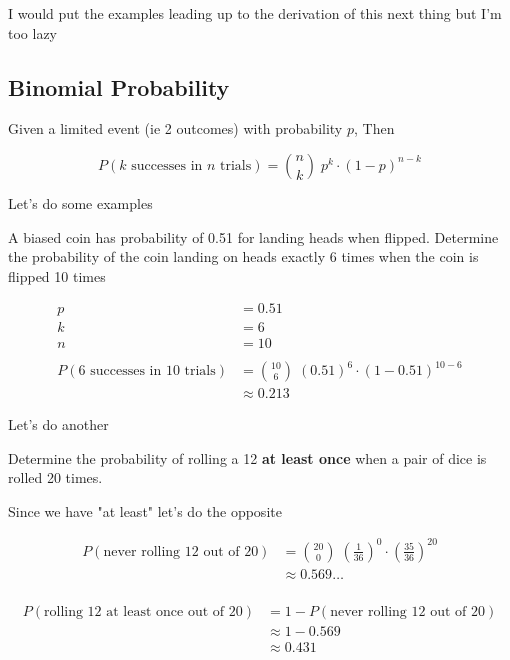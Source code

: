 \documentclass[../../Main.tex]{subfiles}
\begin{document}
I would put the examples leading up to the derivation of this next thing but I'm too lazy

\subsection{Binomial Probability}

\begin{definition}
    Given a limited event (ie 2 outcomes) with probability $p$, Then 

    $$P(k \text{ successes in } n \text{ trials}) = {n \choose k} \; p^k \cdot (1 - p)^{n - k}$$
\end{definition}

\begin{example}
    Let's do some examples

    A biased coin has probability of 0.51 for landing heads when flipped. Determine the probability of the coin landing on heads exactly 6 times when the coin is flipped 10 times

    \begin{align*}
        p &= 0.51 \\
        k &= 6 \tag{successes} \\
        n &= 10 \\
        \\
        P(6 \text{ successes in } 10 \text{ trials}) &= {10 \choose 6} \; (0.51)^6 \cdot (1 - 0.51)^{10 - 6} \\
        &\approx \boxed{0.213}
    \end{align*}
\end{example}

\begin{example}
    Let's do another

    Determine the probability of rolling a 12 \textbf{at least once} when a pair of dice is rolled 20 times.

    Since we have "at least" let's do the opposite

    \begin{align*}
        P(\text{never rolling 12 out of 20}) &= {20 \choose 0} \; \left(\frac{1}{36}\right)^0 \cdot \left(\frac{35}{36}\right)^{20} \\
        &\approx 0.569 \ldots \\
    \end{align*}

    \begin{align*}
        P(\text{rolling 12 at least once out of 20}) &= 1 - P(\text{never rolling 12 out of 20}) \\
        &\approx 1 - 0.569 \\
        &\approx \boxed{0.431} \\
    \end{align*}

\end{example}

\end{document}
